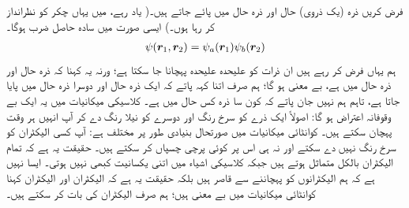 فرض کریں ذرہ  (یک ذروی) حال  اور ذرہ  حال  میں پائے جاتے ہیں۔( یاد رہے، میں یہاں چکر کو نظرانداز کر رہا ہوں۔) ایسی صورت میں  سادہ حاصل ضرب ہوگا۔
\begin{align}
	\psi({{\boldsymbol{r}}}_1, {{\boldsymbol{r}}}_2)=\psi_a({{\boldsymbol{r}}}_1)\psi_b({{\boldsymbol{r}}}_2)
\end{align}
 ہم یہاں فرض کر رہے ہیں ان ذرات کو علیحدہ علیحدہ پہچانا جا سکتا ہے؛ ورنہ یہ کہنا کہ ذرہ  حال  اور ذرہ  حال  میں ہے، بے معنی ہو گا؛ ہم صرف اتنا کہہ پاتے کہ ایک ذرہ حال  اور دوسرا ذرہ حال  میں پایا جاتا ہے، تاہم ہم نہیں جان پاتے کہ کون سا ذرہ کس حال میں ہے۔ کلاسیکی میکانیات میں یہ ایک بے وقوفانہ اعتراض ہو گا: اصولاً ایک ذرے کو سرخ رنگ اور دوسرے کو نیلا رنگ دے کر آپ انہیں ہر وقت پہچان سکتے ہیں۔ کوانٹائی میکانیات میں صورتحال بنیادی طور پر مختلف ہے: آپ کسی الیکٹران کو سرخ رنگ نہیں دے سکتے اور نہ ہی اس پر کوئی پرچی چسپاں کر سکتے ہیں۔ حقیقت یہ ہے کہ تمام الیکٹران بالکل متماثل ہوتے ہیں جبکہ کلاسیکی اشیاء میں اتنی یکسانیت کبھی نہیں ہوتی۔ ایسا نہیں ہے کہ ہم الیکٹرانوں کو پہچاننے سے قاصر ہیں بلکہ حقیقت یہ ہے کہ الیکٹران اور  الیکٹران کہنا کوانٹائی میکانیات میں بے معنی ہیں؛ ہم صرف الیکٹران کی بات کر سکتے ہیں۔
 

